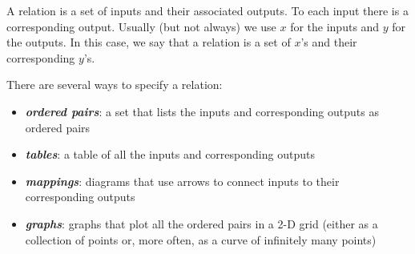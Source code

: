 A relation is a set of inputs and their associated outputs.
To each input there is a corresponding output.
Usually (but not always) we use $x$ for the inputs
and $y$ for the outputs.
In this case, we say that a relation is 
a set of $x$'s and their corresponding $y$'s.

There are several ways to specify a relation:
\begin{itemize}
    \item {\bfseries\itshape ordered pairs}: 
    a set that lists the inputs and corresponding outputs as ordered pairs
    \item {\bfseries\itshape tables}: 
    a table of all the inputs and corresponding outputs
    \item {\bfseries\itshape mappings}: 
    diagrams that use arrows to connect inputs to their corresponding outputs
    \item {\bfseries\itshape graphs}: 
    graphs that plot all the ordered pairs in a 2-D grid 
    (either as a collection of points or, more often, as a curve of infinitely many points)
\end{itemize}


